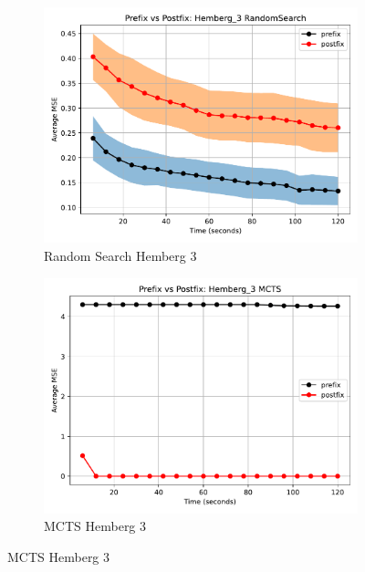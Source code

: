 \documentclass[12pt]{iopart}
\begin{document}
\begin{figure}
    \centering
    
    \begin{subfigure}[b]{0.4\textwidth}
        \includegraphics[width=\linewidth, keepaspectratio]{Hemberg_Benchmarks/PrePostHemberg_3RandomSearch.pdf}
        \caption{Random Search Hemberg 3}
        \label{subfig:hemberg_3_RS}
    \end{subfigure}
    \begin{subfigure}[b]{0.4\textwidth}
        \includegraphics[width=\linewidth, keepaspectratio]{Hemberg_Benchmarks/PrePostHemberg_3MCTS.pdf}
        \caption{MCTS Hemberg 3}
        \label{subfig:hemberg_3_MCTS}
    \end{subfigure}
    

\end{figure}
\end{document}

